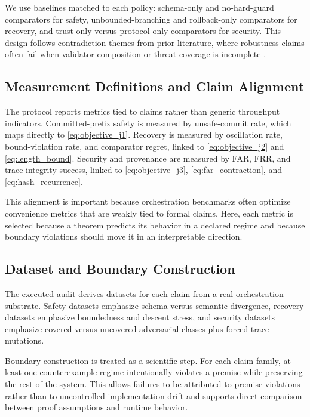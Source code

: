 \documentclass{article} %
\begin{document}
We use baselines matched to each policy: schema-only and no-hard-guard comparators for safety, unbounded-branching and rollback-only comparators for recovery, and trust-only versus protocol-only comparators for security. This design follows contradiction themes from prior literature, where robustness claims often fail when validator composition or threat coverage is incomplete \citep{ferrag2026,gao2025,ismail2025,ferrag2025}.

\subsection{Measurement Definitions and Claim Alignment}
The protocol reports metrics tied to claims rather than generic throughput indicators. Committed-prefix safety is measured by unsafe-commit rate, which maps directly to \eqref{eq:objective_j1}. Recovery is measured by oscillation rate, bound-violation rate, and comparator regret, linked to \eqref{eq:objective_j2} and \eqref{eq:length_bound}. Security and provenance are measured by FAR, FRR, and trace-integrity success, linked to \eqref{eq:objective_j3}, \eqref{eq:far_contraction}, and \eqref{eq:hash_recurrence}.

This alignment is important because orchestration benchmarks often optimize convenience metrics that are weakly tied to formal claims. Here, each metric is selected because a theorem predicts its behavior in a declared regime and because boundary violations should move it in an interpretable direction.

\subsection{Dataset and Boundary Construction}
The executed audit derives datasets for each claim from a real orchestration substrate. Safety datasets emphasize schema-versus-semantic divergence, recovery datasets emphasize boundedness and descent stress, and security datasets emphasize covered versus uncovered adversarial classes plus forced trace mutations.

Boundary construction is treated as a scientific step. For each claim family, at least one counterexample regime intentionally violates a premise while preserving the rest of the system. This allows failures to be attributed to premise violations rather than to uncontrolled implementation drift and supports direct comparison between proof assumptions and runtime behavior.
\end{document}
